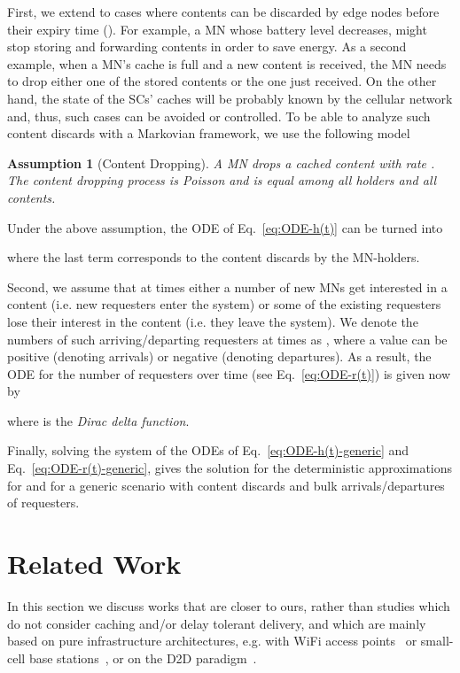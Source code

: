 \documentclass[10pt,conference,letterpaper]{IEEEtran}
\newtheorem{assumption}{Assumption}
\newcommand{\eq}[1]{Eq.~\eqref{#1}}
\begin{document}
First, we extend to cases where contents can be discarded by edge nodes before their expiry time (). For example, a MN whose battery level decreases, might stop storing and forwarding contents in order to save energy. As a second example, when a MN's cache is full and a new content is received, the MN needs to drop either one of the stored contents or the one just received. On the other hand, the state of the SCs' caches will be probably known by the cellular network and, thus, such cases can be avoided or controlled. To be able to analyze such content discards with a Markovian framework, we use the following model
\begin{assumption}[Content Dropping]\label{ass:dropping} A MN drops a cached content with rate . The content dropping process is Poisson and  is equal among all holders and all contents.
\end{assumption}
Under the above assumption, the ODE of \eq{eq:ODE-h(t)} can be turned into

where the last term corresponds to the content discards by the MN-holders.

Second, we assume that at times  either a number of new MNs get interested in a content (i.e. new requesters enter the system) or some of the existing requesters lose their interest in the content (i.e. they leave the system). We denote the numbers of such arriving/departing requesters at times  as , where a value  can be positive (denoting arrivals) or negative (denoting departures). As a result, the ODE for the number of requesters  over time (see \eq{eq:ODE-r(t)}) is given now by

where  is the \textit{Dirac delta function}.

Finally, solving the system of the ODEs of \eq{eq:ODE-h(t)-generic} and \eq{eq:ODE-r(t)-generic}, gives the solution for the deterministic approximations for  and  for a generic scenario with content discards and bulk arrivals/departures of requesters.




\section{Related Work}\label{sec:related}
In this section we discuss works that are closer to ours, rather than studies which do not consider caching and/or delay tolerant delivery, and which are mainly based on pure infrastructure architectures, e.g. with WiFi access points~\cite{Offloading-Wifi} or small-cell base stations~\cite{femtocell-survey,HetNets-paradigm}, or on the D2D paradigm~\cite{survey-d2d}.
\end{document}
